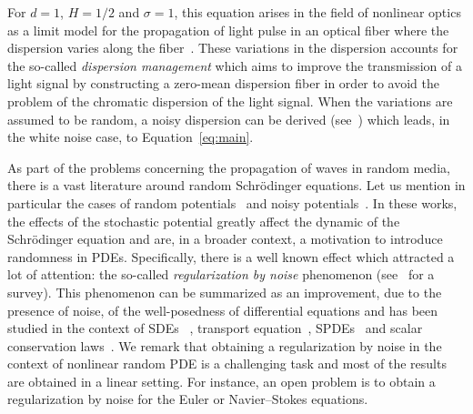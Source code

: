 \documentclass[AHL,Unicode,longabstracts,published]{cedram}
\begin{document}
For $d=1$, $H=1/2$ and $\sigma = 1$, this equation arises in the field of nonlinear optics as a limit model for the propagation of light pulse in an optical fiber where the dispersion varies along the fiber~\cite{agrawal2001applications,agrawal2007nonlinear}. These variations in the dispersion accounts for the so-called \emph{dispersion management} which aims to improve the transmission of a light signal by constructing a zero-mean dispersion fiber in order to avoid the problem of the chromatic dispersion of the light signal. When the variations are assumed to be random, a noisy dispersion can be derived (see~\cite{de2010nonlinear,marty2006splitting}) which leads, in the white noise case, to Equation~\eqref{eq:main}.

As part of the problems concerning the propagation of waves in random media, there is a vast literature around random Schr\"odinger equations. Let us mention in particular the cases of random potentials~\cite{erdHos2008quantum,erdHos2000linear} and noisy potentials~\cite{de2002effect,de2005blow,de1999stochastic}. In these works, the effects of the stochastic potential greatly affect the dynamic of the Schr\"odinger equation and are, in a broader context, a motivation to introduce randomness in PDEs. Specifically, there is a well known effect which attracted a lot of attention: the so-called \emph{regularization by noise} phenomenon (see~\cite{flandoli2011random} for a survey). This phenomenon can be summarized as an improvement, due to the presence of noise, of the well-posedness of differential equations and has been studied in the context of SDEs
~\cite{CATELLIER20162323,krylov2005strong,priola2012pathwise,veretennikov1981strong,
zvonkin1974transformation}, transport equation~\cite{catellier2016rough,fedrizzi2013noise,flandoli2010well}, SPDEs~\cite{da2013strong} and scalar conservation laws~\cite{gess2017long}. We remark that obtaining a regularization by noise in the context of nonlinear random PDE is a challenging task and most of the results are obtained in a linear setting. For instance, an open problem is to obtain a regularization by noise for the Euler or Navier--Stokes equations.
\end{document}
